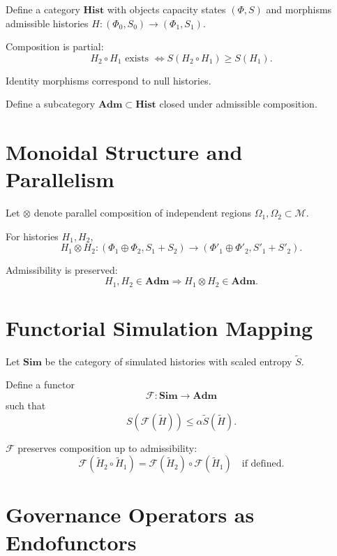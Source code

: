 \documentclass[12pt,oneside]{book}
\begin{document}
Define a category \(\mathbf{Hist}\) with objects capacity states \((\Phi,S)\)
and morphisms admissible histories \(H : (\Phi_0,S_0)\to(\Phi_1,S_1)\).

Composition is partial:
\begin{equation}
H_2 \circ H_1 \text{ exists } \iff S(H_2 \circ H_1) \ge S(H_1).
\end{equation}

Identity morphisms correspond to null histories.

Define a subcategory \(\mathbf{Adm} \subset \mathbf{Hist}\)
closed under admissible composition.

\chapter{Monoidal Structure and Parallelism}

Let \(\otimes\) denote parallel composition of independent regions
\(\Omega_1,\Omega_2 \subset \mathcal{M}\).

For histories \(H_1,H_2\),
\begin{equation}
H_1 \otimes H_2 : (\Phi_1\oplus\Phi_2, S_1+S_2)
\to
(\Phi'_1\oplus\Phi'_2, S'_1+S'_2).
\end{equation}

Admissibility is preserved:
\begin{equation}
H_1,H_2 \in \mathbf{Adm}
\Rightarrow
H_1 \otimes H_2 \in \mathbf{Adm}.
\end{equation}

\chapter{Functorial Simulation Mapping}

Let \(\mathbf{Sim}\) be the category of simulated histories
with scaled entropy \(\tilde{S}\).

Define a functor
\[
\mathcal{F} : \mathbf{Sim} \to \mathbf{Adm}
\]
such that
\begin{equation}
S(\mathcal{F}(\tilde{H})) \le \alpha \tilde{S}(\tilde{H}).
\end{equation}

\(\mathcal{F}\) preserves composition up to admissibility:
\begin{equation}
\mathcal{F}(\tilde{H}_2 \circ \tilde{H}_1)
=
\mathcal{F}(\tilde{H}_2)\circ \mathcal{F}(\tilde{H}_1)
\quad \text{if defined}.
\end{equation}

\chapter{Governance Operators as Endofunctors}
\end{document}
